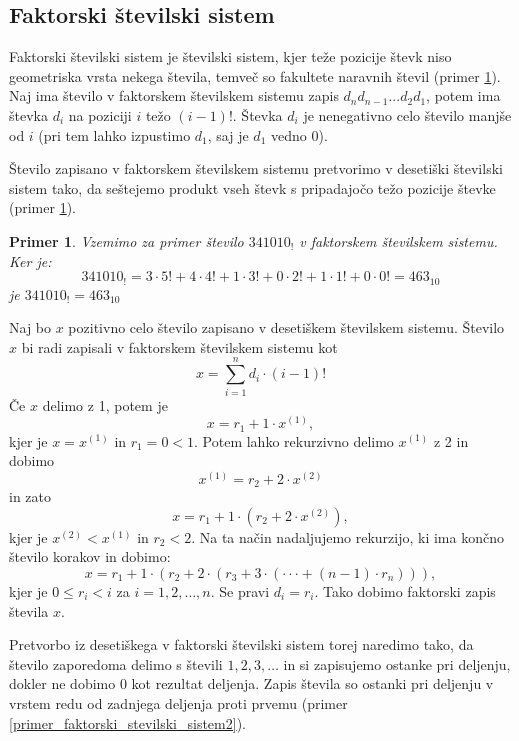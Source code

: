 \documentclass[a4paper, 12pt]{book}
\newtheorem{primer}{Primer}[chapter]
\begin{document}
\subsection{ Faktorski številski sistem }

Faktorski številski sistem je številski sistem, kjer teže pozicije števk niso geometriska vrsta nekega števila, temveč so fakultete naravnih števil (primer \ref{primer_faktorski_stevilski_sistem1}). Naj ima število v faktorskem številskem sistemu zapis $d_nd_{n-1}...d_2d_1$, potem ima števka $d_i$ na poziciji $i$ težo $(i-1)!$. Števka $d_i$ je nenegativno celo število manjše od $i$ (pri tem lahko izpustimo $d_1$, saj je $d_1$ vedno $0$). 

Število zapisano v faktorskem številskem sistemu pretvorimo v desetiški številski sistem tako, da seštejemo produkt vseh števk s pripadajočo težo pozicije števke (primer \ref{primer_faktorski_stevilski_sistem1}).

\begin{primer}
\label{primer_faktorski_stevilski_sistem1}
    Vzemimo za primer število $341010_{!}$ v faktorskem številskem sistemu. Ker je:
    \[
        341010_{!} = 3 \cdot 5! + 4 \cdot 4! + 1 \cdot 3! + 0 \cdot 2! + 1 \cdot 1! + 0 \cdot 0! = 463_{10} 
    \]
    je $341010_{!} = 463_{10}$
\end{primer}

Naj bo $x$ pozitivno celo število zapisano v desetiškem številskem sistemu. Število $x$ bi radi zapisali v faktorskem številskem sistemu kot
\[
    x = \sum_{i=1}^{n} d_i \cdot (i-1)!
\]
Če $x$ delimo z 1, potem je 
\[
    x = r_1 + 1 \cdot x^{(1)},
\]
kjer je $x = x^{(1)}$ in $r_1 = 0 < 1$. Potem lahko rekurzivno delimo $x^{(1)}$ z 2 in dobimo
\[
    x^{(1)} = r_2 + 2 \cdot x^{(2)}
\]
in zato
\[
    x = r_1 + 1 \cdot (r_2 + 2 \cdot x^{(2)}),
\]
kjer je $x^{(2)} < x^{(1)}$ in $r_2 < 2$. Na ta način nadaljujemo rekurzijo, ki ima končno število korakov in dobimo:
\[
    x = r_1 + 1 \cdot (r_2 + 2 \cdot(r_3 + 3 \cdot(\cdot\cdot\cdot + (n-1) \cdot r_n))),
\]
kjer je $0 \leq r_i < i$ za $i = 1, 2, \dots, n$. Se pravi $d_i = r_i$. Tako dobimo faktorski zapis števila $x$.

Pretvorbo iz desetiškega v faktorski številski sistem torej naredimo tako, da število zaporedoma delimo s števili $1, 2, 3, \dots$ in si zapisujemo ostanke pri deljenju, dokler ne dobimo $0$ kot rezultat deljenja. Zapis števila so ostanki pri deljenju v vrstem redu od zadnjega deljenja proti prvemu (primer \ref{primer_faktorski_stevilski_sistem2}). 
\end{document}
